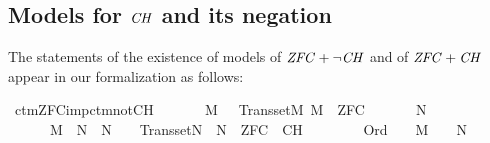 \subsection{Models for $\mathit{CH}$ and its negation}
\label{sec:models-ch-negation}

The statements of the existence of models of $\mathit{ZFC} + \neg\mathit{CH}$ and of
$\mathit{ZFC} + \mathit{CH}$  appear in our formalization as follows:

\begin{isabelle}
\isamarkupfalse%
\ ctm{\isacharunderscore}{\kern0pt}ZFC{\isacharunderscore}{\kern0pt}imp{\isacharunderscore}{\kern0pt}ctm{\isacharunderscore}{\kern0pt}not{\isacharunderscore}{\kern0pt}CH{\isacharcolon}{\kern0pt}\isanewline
\ \ \isanewline
\ \ \ \ {\isachardoublequoteopen}M\ {\isasymapprox}\ {\isasymomega}{\isachardoublequoteclose}\ {\isachardoublequoteopen}Transset{\isacharparenleft}{\kern0pt}M{\isacharparenright}{\kern0pt}{\isachardoublequoteclose}\ {\isachardoublequoteopen}M\ {\isasymTurnstile}\ ZFC{\isachardoublequoteclose}\isanewline
\ \ \isanewline
\ \ \ \ {\isachardoublequoteopen}{\isasymexists}N{\isachardot}{\kern0pt}\isanewline
\ \ \ \ \ \ M\ {\isasymsubseteq}\ N\ {\isasymand}\ N\ {\isasymapprox}\ {\isasymomega}\ {\isasymand}\ Transset{\isacharparenleft}{\kern0pt}N{\isacharparenright}{\kern0pt}\ {\isasymand}\ N\ {\isasymTurnstile}\ ZFC\ {\isasymunion}\ {\isacharbraceleft}{\kern0pt}{\isasymcdot}{\isasymnot}{\isasymcdot}CH{\isasymcdot}{\isasymcdot}{\isacharbraceright}{\kern0pt}\ {\isasymand}\isanewline
\ \ \ \ \ \ {\isacharparenleft}{\kern0pt}{\isasymforall}{\isasymalpha}{\isachardot}{\kern0pt}\ Ord{\isacharparenleft}{\kern0pt}{\isasymalpha}{\isacharparenright}{\kern0pt}\ {\isasymlongrightarrow}\ {\isacharparenleft}{\kern0pt}{\isasymalpha}\ {\isasymin}\ M\ {\isasymlongleftrightarrow}\ {\isasymalpha}\ {\isasymin}\ N{\isacharparenright}{\kern0pt}{\isacharparenright}{\kern0pt}{\isachardoublequoteclose}
\end{isabelle}

